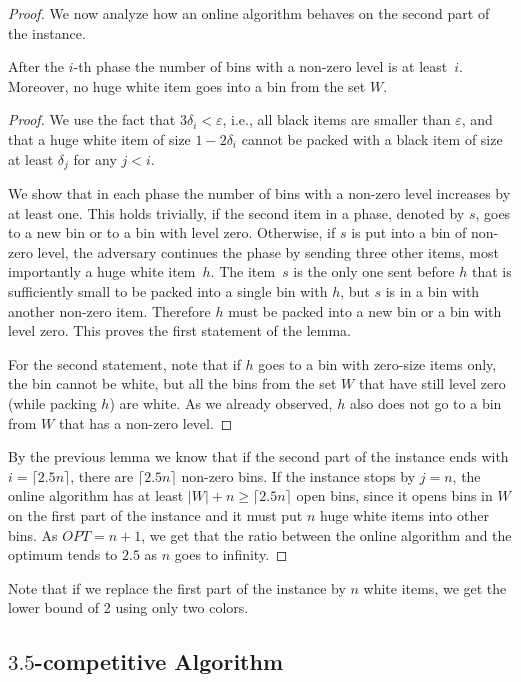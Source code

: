 \documentclass[11pt,a4paper]{article}
\def\vari#1{\mathit{#1}}
\begin{document}
\begin{proof}
We now analyze how an online algorithm behaves on the second part of the instance.

\begin{lemma}
After the $i$-th phase the number of bins with a non-zero level is at least~$i$.
Moreover, no huge white item goes into a bin from the set $W$.
\end{lemma}

\begin{proof}
We use the fact that $3\delta_i < \varepsilon$, i.e., all black items are smaller than $\varepsilon$,
and that a huge white item of size $1 - 2\delta_i$ cannot be packed with a black item of size at least $\delta_j$ for any $j < i$.

We show that in each phase the number of bins with a non-zero level increases by at least one.
This holds trivially, if the second item in a phase, denoted by $s$, goes to a new bin or to a bin with level zero.
Otherwise, if $s$ is put into a bin of non-zero level, the adversary continues the phase by sending
three other items, most importantly a huge white item~$h$. The item~$s$ is the only one sent before $h$
that is sufficiently small to be packed into a single bin with $h$, but $s$ is in a bin with another non-zero item.
Therefore $h$ must be packed into a new bin or a bin with level zero. This proves the first statement of the lemma.

For the second statement, note that if $h$ goes to a bin with zero-size items only, the bin cannot be white,
but all the bins from the set $W$ that have still level zero (while packing $h$) are white.
As we already observed, $h$ also does not go to a bin from $W$ that has a non-zero level.
\end{proof}

By the previous lemma we know that if the second part of the instance ends with $i = \lceil 2.5n\rceil$,
there are $\lceil 2.5n\rceil$ non-zero bins. If the instance stops by $j = n$,
the online algorithm has at least $|W| + n \geq \lceil 2.5n\rceil$ open bins,
since it opens bins in $W$ on the first part of the instance and it must put $n$ huge white items into other bins.
As $\vari{OPT} = n + 1$, we get that the ratio between the online algorithm
and the optimum tends to $2.5$ as $n$ goes to infinity.
\end{proof}

Note that if we replace the first part of the instance by $n$ white items, we get the lower bound of 2 using only two colors.

\subsection{$\mathbf{3.5}$-competitive Algorithm}\label{sec:anySizeUB}
\end{document}
